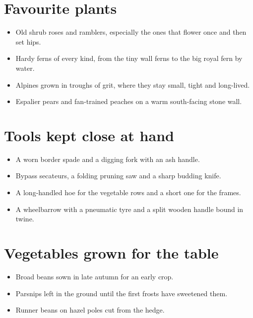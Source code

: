 \documentclass[11pt,a4paper,sans]{moderncv}
\begin{document}

\section{Favourite plants}
\vspace{1pt}
{\small
\begin{itemize}
    \item Old shrub roses and ramblers, especially the ones that flower once and then set hips.
    \item Hardy ferns of every kind, from the tiny wall ferns to the big royal fern by water.
    \item Alpines grown in troughs of grit, where they stay small, tight and long-lived.
    \item Espalier pears and fan-trained peaches on a warm south-facing stone wall.
\end{itemize}\par}
\addvspace{.5em}

\section{Tools kept close at hand}
\vspace{1pt}
{\small
\begin{itemize}
    \item A worn border spade and a digging fork with an ash handle.
    \item Bypass secateurs, a folding pruning saw and a sharp budding knife.
    \item A long-handled hoe for the vegetable rows and a short one for the frames.
    \item A wheelbarrow with a pneumatic tyre and a split wooden handle bound in twine.
\end{itemize}\par}
\addvspace{.5em}

\section{Vegetables grown for the table}
\vspace{1pt}
{\small
\begin{itemize}
    \item Broad beans sown in late autumn for an early crop.
    \item Parsnips left in the ground until the first frosts have sweetened them.
    \item Runner beans on hazel poles cut from the hedge.
\end{itemize}\par}
\addvspace{.5em}
\end{document}

